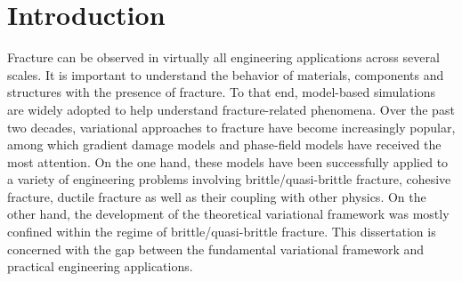 \chapter{Introduction}
\label{section: Chapter1}

Fracture can be observed in virtually all engineering applications across several scales. It is important to understand the behavior of materials, components and structures with the presence of fracture. To that end, model-based simulations are widely adopted to help understand fracture-related phenomena. Over the past two decades, variational approaches to fracture have become increasingly popular, among which gradient damage models and phase-field models have received the most attention. On the one hand, these models have been successfully applied to a variety of engineering problems involving brittle/quasi-brittle fracture, cohesive fracture, ductile fracture as well as their coupling with other physics. On the other hand, the development of the theoretical variational framework was mostly confined within the regime of brittle/quasi-brittle fracture. This dissertation is concerned with the gap between the fundamental variational framework and practical engineering applications.









